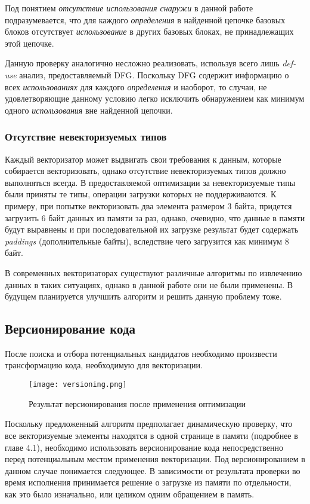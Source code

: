 Под понятием \textit{отсутствие использования снаружи} в данной работе подразумевается, что для каждого \textit{определения} в найденной цепочке базовых блоков отсутствует \textit{использование} в других базовых блоках, не принадлежащих этой цепочке.

Данную проверку аналогично несложно реализовать, используя всего лишь \textit{def-use} анализ, предоставляемый DFG. Поскольку DFG содержит информацию о всех \textit{использованиях} для каждого \textit{определения} и наоборот, то случаи, не удовлетворяющие данному условию легко исключить обнаружением как минимум одного \textit{использования} вне найденной цепочки.

\subsubsection{Отсутствие невекторизуемых типов}

Каждый векторизатор может выдвигать свои требования к данным, которые собирается векторизовать, однако отсутствие невекторизуемых типов должно выполняться всегда. В предоставляемой оптимизации за невекторизуемые типы были приняты те типы, операции загрузки которых не поддерживаются. К примеру, при попытке векторизовать два элемента размером 3 байта, придется загрузить 6 байт данных из памяти за раз, однако, очевидно, что данные в памяти будут выравнены и при последовательной их загрузке результат будет содержать \textit{paddings} (дополнительные байты), вследствие чего загрузится как минимум 8 байт.

В современных векторизаторах существуют различные алгоритмы по извлечению данных в таких ситуациях, однако в данной работе они не были применены. В будущем планируется улучшить алгоритм и решить данную проблему тоже.

\subsection{Версионирование кода}

После поиска и отбора потенциальных кандидатов необходимо произвести трансформацию кода, необходимую для векторизации.

\begin{figure}[!htb]
    \centering
    \texttt{[image: versioning.png]}
    \caption{Результат версионирования после применения оптимизации}
    \label{vers}
\end{figure}

Поскольку предложенный алгоритм предполагает динамическую проверку, что все векторизуемые элементы находятся в одной странице в памяти (подробнее в главе 4.1), необходимо использовать версионирование кода непосредственно перед потенциальным местом применения векторизации. Под версионированием в данном случае понимается следующее. В зависимости от результата проверки во время исполнения принимается решение о загрузке из памяти по отдельности, как это было изначально, или целиком одним обращением в память.

